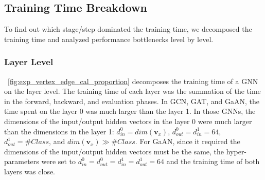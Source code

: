 \subsection{Training Time Breakdown}
\label{sec:training_time_breakdown}

To find out which stage/step dominated the training time, we decomposed the training time and analyzed performance bottlenecks level by level.

\subsubsection{Layer Level}

\figurename~\ref{fig:exp_vertex_edge_cal_proportion} decomposes the training time of a GNN on the layer level.
%
The training time of each layer was the summation of the time in the forward, backward, and evaluation phases.
%
In GCN, GAT, and GaAN, the time spent on the layer 0 was much larger than the layer 1.
%
In those GNNs, the dimensions of the input/output hidden vectors in the layer 0 were much larger than the dimensions in the layer 1: $d^0_{in}=dim(\boldsymbol{v}_x)$, $d^0_{out}=d^1_{in}=64$, $d^1_{out}=\#Class$, and $dim(\boldsymbol{v}_x) \gg \#Class$.
%
For GaAN, since it required the dimensions of the input/output hidden vectors must be the same, the hyper-parameters were set to $d^0_{in}=d^0_{out}=d^1_{in}=d^1_{out}=64$ and the training time of both layers was close.

